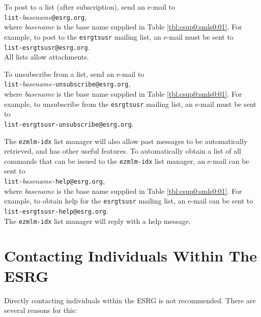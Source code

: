 To post to a 
list (after subscription), send an e-mail to \\
\longthingindent\texttt{list-}\emph{basename}\texttt{@esrg.org}, \\
where 
\emph{basename} is the base name supplied in 
Table \ref{tbl:csup0:smls0:01}.  For example, to post to the
\texttt{esrgtsusr} mailing list, an e-mail must be sent to \\
\longthingindent\texttt{list-esrgtsusr@esrg.org}.  \\
All lists allow attachments.

To unsubscribe 
from a list, send an e-mail to \\ 
\longthingindent\texttt{list-}\emph{basename}\texttt{-unsubscribe@esrg.org}, \\
where 
\emph{basename} is the base name supplied in 
Table \ref{tbl:csup0:smls0:01}.  For example, to unsubscribe from the
\texttt{esrgtsusr} mailing list, an e-mail must be sent to \\
\longthingindent\texttt{list-esrgtsusr-unsubscribe@esrg.org}.

The \texttt{ezmlm-idx} list manager will also allow past messages
to be automatically retrieved, and has other useful features.  
To automatically obtain a list of
all commands that can be issued to the 
\texttt{ezmlm-idx} list manager, an e-mail can be sent to \\
\longthingindent\texttt{list-}\emph{basename}\texttt{-help@esrg.org}, \\
where 
\emph{basename} is the base name supplied in 
Table \ref{tbl:csup0:smls0:01}.
For example, to obtain help for the
\texttt{esrgtsusr} mailing list, an e-mail can be sent to \\
\longthingindent\texttt{list-esrgtsusr-help@esrg.org}. \\
The \texttt{ezmlm-idx} list manager will reply with
a help message.


\section{Contacting Individuals Within The ESRG}
\label{csup0:scin0}

Directly contacting individuals within the ESRG is not recommended.
There are several reasons for this:

